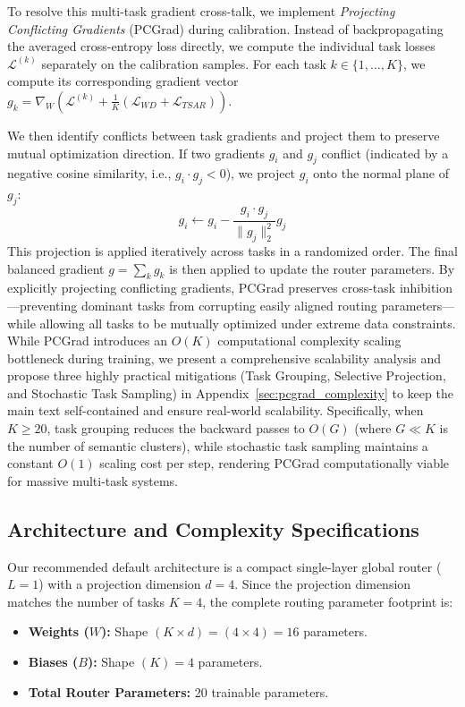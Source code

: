 To resolve this multi-task gradient cross-talk, we implement \emph{Projecting Conflicting
Gradients} (PCGrad) \cite{yu2020gradient} during calibration. Instead of backpropagating the
averaged cross-entropy loss directly, we compute the individual task losses $\mathcal{L}^{(k)}$
separately on the calibration samples. For each task $k \in \{1, \dots, K\}$, we compute its
corresponding gradient vector $g_k = \nabla_{W} \left( \mathcal{L}^{(k)} + \frac{1}{K}
(\mathcal{L}_{WD} + \mathcal{L}_{TSAR}) \right)$. 

We then identify conflicts between task gradients and project them to preserve mutual optimization
direction. If two gradients $g_i$ and $g_j$ conflict (indicated by a negative cosine similarity,
i.e., $g_i \cdot g_j < 0$), we project $g_i$ onto the normal plane of $g_j$:
\begin{equation}
g_i \leftarrow g_i - \frac{g_i \cdot g_j}{\|g_j\|_2^2} g_j
\label{eq:pcgrad_proj}
\end{equation}
This projection is applied iteratively across tasks in a randomized order. The final balanced
gradient $g = \sum_k g_k$ is then applied to update the router parameters. By explicitly projecting
conflicting gradients, PCGrad preserves cross-task inhibition—preventing dominant tasks from
corrupting easily aligned routing parameters—while allowing all tasks to be mutually optimized under
extreme data constraints. While PCGrad introduces an $O(K)$ computational complexity scaling
bottleneck during training, we present a comprehensive scalability analysis and propose three highly
practical mitigations (Task Grouping, Selective Projection, and Stochastic Task Sampling) in
Appendix~\ref{sec:pcgrad_complexity} to keep the main text self-contained and ensure real-world
scalability. Specifically, when $K \ge 20$, task grouping reduces the backward passes to $O(G)$
(where $G \ll K$ is the number of semantic clusters), while stochastic task sampling maintains a
constant $O(1)$ scaling cost per step, rendering PCGrad computationally viable for massive
multi-task systems.

\subsection{Architecture and Complexity Specifications}
Our recommended default architecture is a compact single-layer global router ($L=1$) with a projection dimension $d=4$. Since the projection dimension matches the number of tasks $K=4$, the complete routing parameter footprint is:
\begin{itemize}
  \item \textbf{Weights ($W$):} Shape $(K \times d) = (4 \times 4) = 16$ parameters.
  \item \textbf{Biases ($B$):} Shape $(K) = 4$ parameters.
  \item \textbf{Total Router Parameters:} 20 trainable parameters.
\end{itemize}

